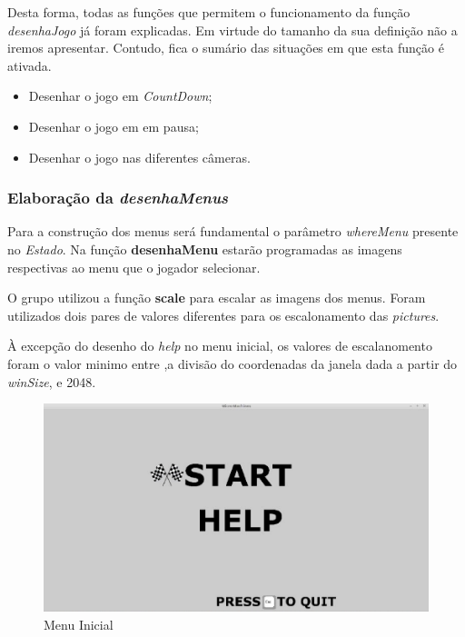 \documentclass[a4paper]{report} %
\begin{document}
Desta forma, todas as funções que permitem o funcionamento da função \emph{desenhaJogo} já foram explicadas. Em virtude do tamanho da sua definição não a iremos apresentar. Contudo, fica o sumário das situações em que esta função é ativada.

\begin{itemize}

    \item Desenhar o jogo em \textit{CountDown};
    \item Desenhar o jogo em em pausa;
    \item Desenhar o jogo nas diferentes câmeras.

\end{itemize}  

\newpage

\subsubsection{Elaboração da \emph{desenhaMenus}}

Para a construção dos menus será fundamental o parâmetro \emph{whereMenu} presente no \emph{Estado}. Na função \textbf{desenhaMenu} estarão programadas as imagens respectivas ao menu que o jogador selecionar.

O grupo utilizou a função \textbf{scale} para escalar as imagens dos menus. Foram utilizados dois pares de valores diferentes para os escalonamento das \emph{pictures}. 

À excepção do desenho do \textit{help} no menu inicial, os valores de escalanomento foram o valor minimo entre ,a divisão do coordenadas da janela dada a partir do \emph{winSize}, e 2048.

\begin{figure}[h!]

  \centering
  \includegraphics[scale= 0.4]{Imagens/Inicio.png}
  \caption{Menu Inicial}

\end{figure}
\end{document}
